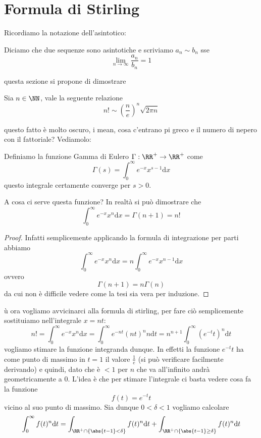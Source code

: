 \documentclass[11pt]{scrartcl}
\begin{document}
  \newpage
  
  \section{Formula di Stirling}
  
  Ricordiamo la notazione dell'asintotico:
  \begin{definition}[Asintotici]
  	Diciamo che due sequenze sono asintotiche e scriviamo $a_n\sim b_n$ sse 
  	$$\lim_{n\to \infty}\frac{a_n}{b_n}=1$$ 
  \end{definition}
  questa sezione si propone di dimostrare
  \begin{theorem}
  	Sia $n\in\NN$, vale la seguente relazione
  	$$n!\sim \left(\frac{n}{e}\right)^n\sqrt{2\pi n}$$
  \end{theorem}
  questo fatto è molto oscuro, i mean, cosa c'entrano pi greco e il numero di nepero con il fattoriale? Vediamolo:
  \begin{definition}
  	Definiamo la funzione Gamma di Eulero $\Gamma:\RR^+\to\RR^+$ come
  	$$\Gamma(s)=\int_0^\infty e^{-x}x^{s-1}\text{d}x$$
  	questo integrale certamente converge per $s>0$.
  \end{definition}
  A cosa ci serve questa funzione? In realtà si può dimostrare che 
  $$\int_0^\infty e^{-x}x^{n}\text{d}x=\Gamma(n+1)=n!$$
  \begin{proof}
	  Infatti semplicemente applicando la formula di integrazione per parti abbiamo
	  $$\int_0^\infty e^{-x}x^{n}\text{d}x=n\int_0^\infty e^{-x}x^{n-1}\text{d}x$$
	  ovvero 
	  $$\Gamma(n+1)=n\Gamma(n)$$
	  da cui non è difficile vedere come la tesi sia vera per induzione.
  \end{proof}ù
  ora vogliamo avvicinarci alla formula di stirling, per fare ciò semplicemente sostituiamo nell'integrale $x=nt$:
  $$n!=\int_0^\infty e^{-x}x^{n}\text{d}x=\int_0^\infty e^{-nt}(nt)^{n}n\text{d}t=n^{n+1}\int_0^\infty (e^{-t}t)^n\text{d}t$$
  vogliamo stimare la funzione integranda dunque. In effetti la funzione $e^{-t}t$ ha come punto di massimo in $t=1$ il valore $\frac{1}{e}$ (si può verificare facilmente derivando) e quindi, dato che è $<1$ per $n$ che va all'infinito andrà geometricamente a $0$. L'idea è che per stimare l'integrale ci basta vedere cosa fa la funzione
  $$f(t)=e^{-t}t$$
  vicino al suo punto di massimo. Sia dunque $0<\delta <1$ vogliamo calcolare
  $$\int_0^\infty f(t)^n\text{d}t=\int_{\RR^+\cap\left\{\abs{t-1}<\delta\right\}}f(t)^n\text{d}t+\int_{\RR^+\cap\left\{\abs{t-1}\ge\delta\right\}}f(t)^n\text{d}t$$
\end{document}
